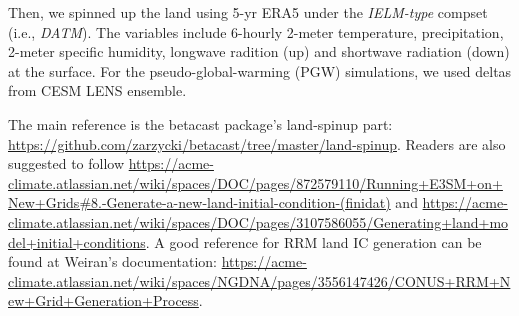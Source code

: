 \documentclass[journal abbreviation, manuscript]{copernicus}
\begin{document}
Then, we spinned up the land using 5-yr ERA5 under the \emph{IELM-type} compset (i.e., \emph{DATM}). The variables include 6-hourly 2-meter temperature, precipitation, 2-meter specific humidity, longwave radition (up) and shortwave radiation (down) at the surface. For the pseudo-global-warming (PGW) simulations, we used deltas from CESM LENS ensemble.

The main reference is the betacast package's land-spinup part: \url{https://github.com/zarzycki/betacast/tree/master/land-spinup}. Readers are also suggested to follow \url{https://acme-climate.atlassian.net/wiki/spaces/DOC/pages/872579110/Running+E3SM+on+New+Grids#8.-Generate-a-new-land-initial-condition-(finidat)} and \url{https://acme-climate.atlassian.net/wiki/spaces/DOC/pages/3107586055/Generating+land+model+initial+conditions}. A good reference for RRM land IC generation can be found at Weiran's documentation: \url{https://acme-climate.atlassian.net/wiki/spaces/NGDNA/pages/3556147426/CONUS+RRM+New+Grid+Generation+Process}. 
\end{document}
